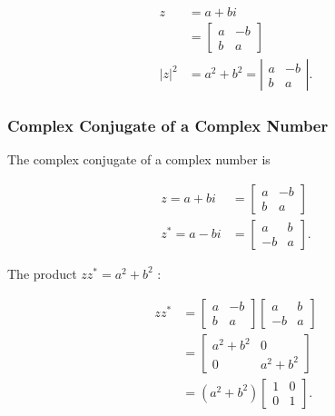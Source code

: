 \documentclass[10pt]{article}
\begin{document}
$$
\begin{aligned}
z & =a+b i \\
& =\left[\begin{array}{cc}
a & -b \\
b & a
\end{array}\right] \\
|z|^{2} & =a^{2}+b^{2}=\left|\begin{array}{cc}
a & -b \\
b & a
\end{array}\right| .
\end{aligned}
$$

\subsubsection{Complex Conjugate of a Complex Number}
The complex conjugate of a complex number is

$$
\begin{aligned}
z=a+b i & =\left[\begin{array}{cc}
a & -b \\
b & a
\end{array}\right] \\
z^{*}=a-b i & =\left[\begin{array}{cc}
a & b \\
-b & a
\end{array}\right] .
\end{aligned}
$$

The product $z z^{*}=a^{2}+b^{2}$ :

$$
\begin{aligned}
z z^{*} & =\left[\begin{array}{cc}
a & -b \\
b & a
\end{array}\right]\left[\begin{array}{cc}
a & b \\
-b & a
\end{array}\right] \\
& =\left[\begin{array}{cc}
a^{2}+b^{2} & 0 \\
0 & a^{2}+b^{2}
\end{array}\right] \\
& =\left(a^{2}+b^{2}\right)\left[\begin{array}{ll}
1 & 0 \\
0 & 1
\end{array}\right] .
\end{aligned}
$$
\end{document}
